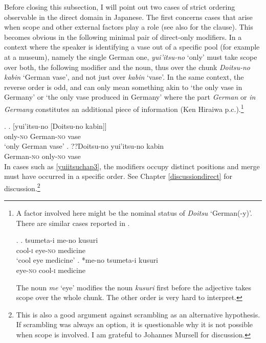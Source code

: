 \documentclass [output=book,colorlinks,citecolor=brown]{langscibook}
\begin{document}
Before closing this subsection, I will point out two cases of strict ordering observable in the direct domain in Japanese. The first concerns cases that arise when scope and other external factors play a role (see also \citealt{ramchand:2014:deriving} for the clause). This becomes obvious in the following minimal pair of direct-only modifiers. In a context where the speaker is identifying a vase out of a specific pool (for example at a museum), namely the single German one, \textit{yui'itsu-no} `only’ must take scope over both, the following modifier and the noun, thus over the chunk \textit{Doitsu-no kabin} `German vase’, and not just over \textit{kabin} `vase’. In the same context, the reverse order is odd, and can only mean something akin to `the only vase in Germany' or `the only vase produced in Germany' where the part \textit{German} or \textit{in Germany} constitutes an additional piece of information (Ken Hiraiwa p.c.).\footnote{A factor involved here might be the nominal status of \textit{Doitsu} `German(-y)’. There are similar cases reported in \citet{shimamura:2014:go}.

\par

\ex. \ag. tsumeta-i me-no kusuri\\
cool-\textsc{i} eye-\textsc{no} medicine\\
`cool eye medicine’
\bg. *me-no tsumeta-i kusuri\\
eye-\textsc{no} cool-\textsc{i} medicine \null \hfill \citep[163]{shimamura:2014:go}\\

\par

The noun \textit{me} `eye’ modifies the noun \textit{kusuri} first before the adjective takes scope over the whole chunk. The other order is very hard to interpret.}


\ex. \label{yuiitsuchap3} \ag. [yui'itsu-no [Doitsu-no kabin]]\\
only-\textsc{no} German-\textsc{no} vase\\
`only German vase'
\bg. ??Doitsu-no yui'itsu-no kabin\\
German-\textsc{no} only-\textsc{no} vase\\

In cases such as \ref{yuiitsuchap3}, the modifiers occupy distinct positions and merge must have occurred in a specific order. See Chapter \ref{discussiondirect} for discussion.\footnote{This is also a good argument against scrambling as an alternative hypothesis. If scrambling was always an option, it is questionable why it is not possible when scope is involved. I am grateful to Johannes Mursell for discussion.}
\end{document}

